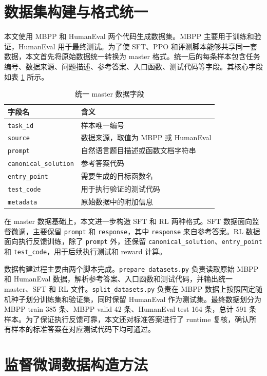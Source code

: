 \section{数据集构建与格式统一}

本文使用 MBPP 和 HumanEval 两个代码生成数据集。MBPP 主要用于训练和验证，HumanEval 用于最终测试。为了使 SFT、PPO 和评测脚本能够共享同一套数据，本文首先将原始数据统一转换为 master 格式。统一后的每条样本包含任务编号、数据来源、问题描述、参考答案、入口函数、测试代码等字段。其核心字段如表 \ref{tab:master-fields} 所示。

\begin{table}[!htp]
  \centering
  \caption{统一 master 数据字段}
  \label{tab:master-fields}
  \begin{tabular}{ll}
    \toprule
    字段名 & 含义 \\
    \midrule
    \texttt{task\_id} & 样本唯一编号 \\
    \texttt{source} & 数据来源，取值为 MBPP 或 HumanEval \\
    \texttt{prompt} & 自然语言题目描述或函数文档字符串 \\
    \texttt{canonical\_solution} & 参考答案代码 \\
    \texttt{entry\_point} & 需要生成的目标函数名 \\
    \texttt{test\_code} & 用于执行验证的测试代码 \\
    \texttt{metadata} & 原始数据中的附加信息 \\
    \bottomrule
  \end{tabular}
\end{table}

在 master 数据基础上，本文进一步构造 SFT 和 RL 两种格式。SFT 数据面向监督微调，主要保留 \texttt{prompt} 和 \texttt{response}，其中 \texttt{response} 来自参考答案。RL 数据面向执行反馈训练，除了 \texttt{prompt} 外，还保留 \texttt{canonical\_solution}、\texttt{entry\_point} 和 \texttt{test\_code}，用于后续执行测试和 reward 计算。

数据构建过程主要由两个脚本完成。\texttt{prepare\_datasets.py} 负责读取原始 MBPP 和 HumanEval 数据，解析参考答案、入口函数和测试代码，并输出统一 master、SFT 和 RL 文件。\texttt{split\_datasets.py} 负责在 MBPP 数据上按照固定随机种子划分训练集和验证集，同时保留 HumanEval 作为测试集。最终数据划分为 MBPP train 385 条、MBPP valid 42 条、HumanEval test 164 条，总计 591 条样本。为了保证执行反馈可靠，本文还对标准答案进行了 runtime 复核，确认所有样本的标准答案在对应测试代码下均可通过。

\section{监督微调数据构造方法}

